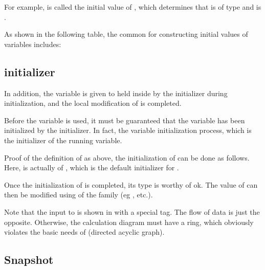 \begin{content}
For example,  is called the initial value of , which determines that  is of type  and  is \code{[784, 10]}.


As shown in the following table, the common  for constructing initial values ​​of variables includes:

\subsection{initializer}

In addition, the variable is given to  held inside  by the initializer  during initialization, and the local modification of  is completed.

Before the variable is used, it must be guaranteed that the variable has been initialized by the initializer. In fact, the variable initialization process, which is the initializer of the running variable.

Proof of the definition of  as above, the initialization of  can be done as follows. Here,  is actually  of , which is the default initializer for .


Once the initialization of  is completed, its type is worthy of ok. The value of  can then be modified using  of the  family (eg , etc.).

Note that the input to  is shown in  with a special  tag. The flow of data is just the opposite. Otherwise, the calculation diagram must have a ring, which obviously violates the basic needs of  (directed acyclic graph).

\subsection{Snapshot}


\end{content}
